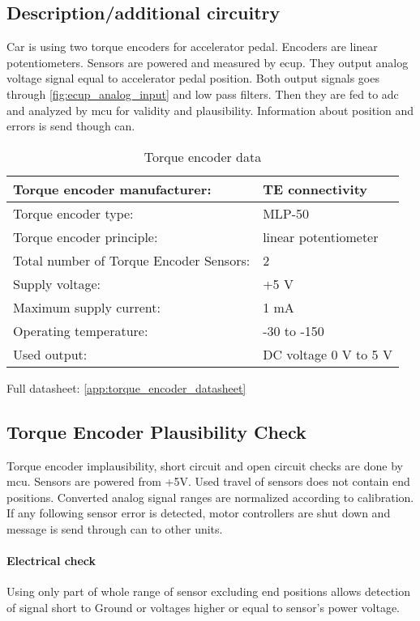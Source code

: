\subsection{Description/additional circuitry}
Car is using two torque encoders for accelerator pedal. Encoders are linear potentiometers. Sensors are powered and measured by \gls{ecup}. They output analog voltage signal equal to accelerator pedal position. Both output signals goes through \ref{fig:ecup_analog_input} and low pass filters. Then they are fed to \gls{adc} and analyzed by \gls{mcu} for validity and plausibility. Information about position and errors is send though \gls{can}.

\begin{table}[H]
	\centering
	\caption{Torque encoder data}
	\begin{tabu}{|X|X|}
		\hline
		Torque encoder manufacturer: & TE connectivity  \\\hline
		Torque encoder type: & MLP-50  \\\hline
		Torque encoder principle: & linear potentiometer  \\\hline
		Total number of Torque Encoder Sensors: & 2  \\\hline
		Supply voltage: & +5 V  \\\hline
		Maximum supply current: & 1 mA  \\\hline
		Operating temperature: & -30 \degC to -150 \degC  \\\hline
		Used output: & DC voltage 0 V to 5 V\\\hline
	\end{tabu}%
	\label{tab:encoder-general}%
\end{table}%

Full datasheet: \ref{app:torque_encoder_datasheet}

\subsection{Torque Encoder Plausibility Check}
Torque encoder implausibility, short circuit and open circuit checks are done by \gls{mcu}. Sensors are powered from +5V. Used travel of sensors does not contain end positions. Converted analog signal ranges are normalized according to calibration.
If any following sensor error is detected, motor controllers are shut down and message is send through \gls{can} to other units.

\paragraph{Electrical check} 
Using only part of whole range of sensor excluding end positions allows detection of signal short to Ground or voltages higher or equal to sensor's power voltage.

